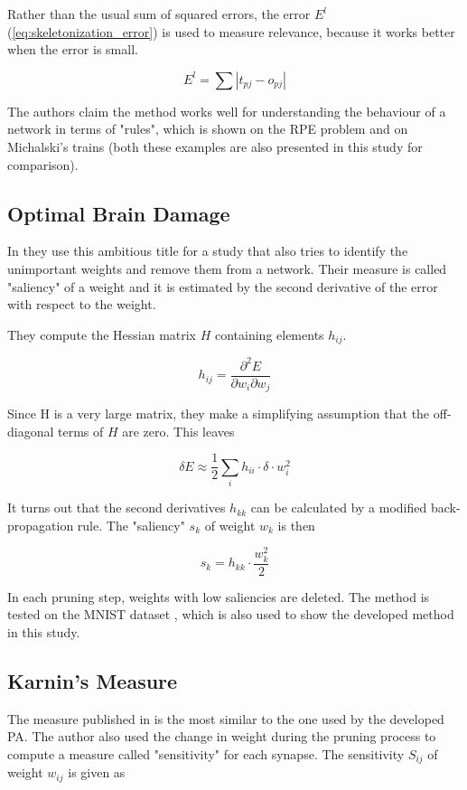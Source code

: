 Rather than the usual sum of squared errors, the error $ E^l $ (\cref{eq:skeletonization_error}) is used to measure relevance, because it works better when the error is small.

\begin{equation} \label{eq:skeletonization_error}
E^l = \sum |t_{pj} - o_{pj}|
\end{equation}

The authors claim the method works well for understanding the behaviour of a network in terms of "rules", which is shown on the RPE problem and on Michalski's trains (both these examples are also presented in this study for comparison).

\subsection*{Optimal Brain Damage} \label{ssec:optimal_brain_damage}
In \citep{lecun:obd} they use this ambitious title for a study that also tries to identify the unimportant weights and remove them from a network. Their measure is called "saliency" of a weight and it is estimated by the second derivative of the error with respect to the weight.

They compute the Hessian matrix $ H $ containing elements $ h_{ij} $.

\begin{equation}
h_{ij} = \frac{\partial^2 E}{\partial w_i \partial w_j}
\end{equation}

Since H is a very large matrix, they make a simplifying assumption that the off-diagonal terms of $ H $ are zero. This leaves

\begin{equation}
\delta E \approx \frac{1}{2} \displaystyle{\sum_i h_{ii} \cdot \delta \cdot w_i^2}
\end{equation}

It turns out that the second derivatives $ h_{kk} $ can be calculated by a modified back-propagation rule. The "saliency" $ s_k $ of weight $ w_k $ is then

\begin{equation}
s_k = h_{kk} \cdot \frac{w_k^2}{2}
\end{equation}

In each pruning step, weights with low saliencies are deleted. The method is tested on the MNIST dataset \citep{lecun:mnist}, which is also used to show the developed method in this study.

\subsection*{Karnin's Measure} \label{ssec:karnins_measure}
The measure published in \citep{karnin:pa} is the most similar to the one used by the developed PA. The author also used the change in weight during the pruning process to compute a measure called "sensitivity" for each synapse. The sensitivity $ S_{ij} $ of weight $ w_{ij} $ is given as

